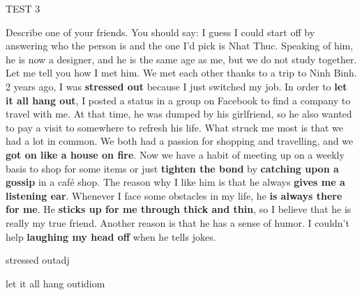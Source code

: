 \begin{glossarymc}[Cambridge 5]
\begin{test}{TEST 3}
\begin{qa}{Describe one of your friends. You should say:}
       I guess I could start off by answering who the person is and the one I'd pick is Nhat Thuc. Speaking of him, he is now a designer, and he is the same age as me, but we do not study together. Let me tell you how I met him. We met each other thanks to a trip to Ninh Binh. 2 years ago, I was \textbf{stressed out} because I just switched my job. In order to \textbf{let it all hang out}, I posted a status in a group on Facebook to find a company to travel with me. At that time, he was dumped by his girlfriend, so he also wanted to pay a visit to somewhere to refresh his life. What struck me most is that we had a lot in common. We both had a passion for shopping and travelling, and we \textbf{got on like a house on fire}. Now we have a habit of meeting up on a weekly basis to shop for some items or just \textbf{tighten the bond} by \textbf{catching upon a gossip} in a café shop. The reason why I like him is that he always \textbf{gives me a listening ear}. Whenever I face some obstacles in my life, he \textbf{is always there for me}. He \textbf{sticks up for me through thick and thin}, so I believe that he is really my true friend. Another reason is that he has a sense of humor. I couldn't help \textbf{laughing my head off} when he tells jokes.
        \end{qa}

        \begin{VocabExplain}[Part 2]
            \begin{ExplainCard}{stressed out}{adj}
            \end{ExplainCard}

            \begin{ExplainCard}{let it all hang out}{idiom}
            \end{ExplainCard}


\end{VocabExplain}
\end{test}
\end{glossarymc}
